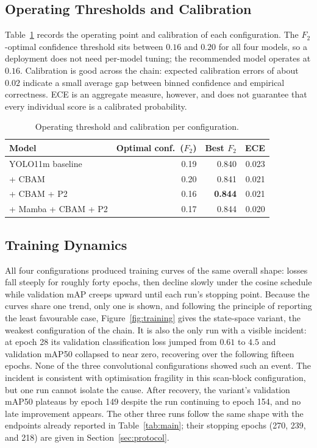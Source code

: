 \subsection{Operating Thresholds and Calibration}
Table~\ref{tab:thrcal} records the operating point and calibration of each
configuration. The $F_2$-optimal confidence threshold sits between $0.16$ and
$0.20$ for all four models, so a deployment does not need per-model tuning;
the recommended model operates at $0.16$. Calibration is good across the
chain: expected calibration errors of about $0.02$ indicate a small average
gap between binned confidence and empirical correctness. ECE is an aggregate
measure, however, and does not guarantee that every individual score is a
calibrated probability.

\begin{table}[tbp]
  \centering
  \caption{Operating threshold and calibration per configuration.}
  \label{tab:thrcal}
  \begin{tabular}{@{}l r r r@{}}
    \toprule
    Model & Optimal conf.\ ($F_2$) & Best $F_2$ & ECE \\
    \midrule
    YOLO11m baseline    & 0.19 & 0.840 & 0.023 \\
    + CBAM              & 0.20 & 0.841 & 0.021 \\
    + CBAM + P2         & 0.16 & \textbf{0.844} & 0.021 \\
    + Mamba + CBAM + P2 & 0.17 & 0.844 & 0.020 \\
    \bottomrule
  \end{tabular}
\end{table}

\subsection{Training Dynamics}
All four configurations produced training curves of the same overall shape:
losses fall steeply for roughly forty epochs, then decline slowly under the
cosine schedule while validation mAP creeps upward until each run's stopping
point. Because the curves share one trend, only one is shown, and following
the principle of reporting the least favourable case, Figure~\ref{fig:training}
gives the state-space variant, the weakest configuration of the chain. It is
also the only run with a visible incident: at epoch 28 its validation
classification loss jumped from $0.61$ to $4.5$ and validation mAP50 collapsed
to near zero, recovering over the following fifteen epochs. None of the three
convolutional configurations showed such an event. The incident is consistent
with optimisation fragility in this scan-block configuration, but one run
cannot isolate the cause. After recovery, the variant's validation mAP50 plateaus by epoch
149 despite the run continuing to epoch 154, and no late improvement appears. The other three runs follow the same
shape with the endpoints already reported in Table~\ref{tab:main}; their
stopping epochs (270, 239, and 218) are given in Section~\ref{sec:protocol}.

